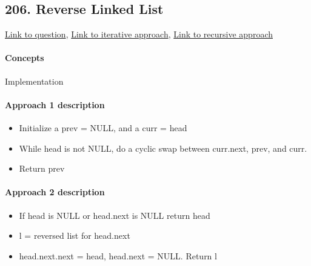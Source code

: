 \documentclass[11pt]{book}
\begin{document}
\subsection{206. Reverse Linked List}
\href{https://leetcode.com/problems/reverse-linked-list/}{Link to question},
\href{https://leetcode.com/submissions/detail/333870150/}{Link to iterative approach},
\href{https://leetcode.com/submissions/detail/333909164/}{Link to recursive approach}
\paragraph{Concepts}
Implementation
\paragraph{Approach 1 description}
\begin{itemize}
    \item Initialize a prev = NULL, and a curr = head
    \item While head is not NULL, do a cyclic swap between curr.next, prev, and curr.
    \item Return prev
\end{itemize}
\paragraph{Approach 2 description}
\begin{itemize}
    \item If head is NULL or head.next is NULL return head
    \item l = reversed list for head.next
    \item head.next.next = head, head.next = NULL. Return l
\end{itemize}


\end{document}
